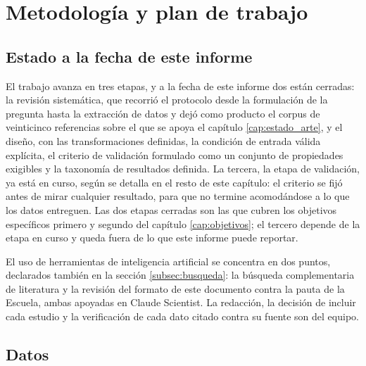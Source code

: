 
\chapter{Metodología y plan de trabajo}
\label{cap:plan}

\section{Estado a la fecha de este informe}

El trabajo avanza en tres etapas, y a la fecha de este informe dos están cerradas: la revisión sistemática, que recorrió el protocolo desde la formulación de la pregunta hasta la extracción de datos y dejó como producto el corpus de veinticinco referencias sobre el que se apoya el capítulo \ref{cap:estado_arte}, y el diseño, con las transformaciones definidas, la condición de entrada válida explícita, el criterio de validación formulado como un conjunto de propiedades exigibles y la taxonomía de resultados definida. La tercera, la etapa de validación, ya está en curso, según se detalla en el resto de este capítulo: el criterio se fijó antes de mirar cualquier resultado, para que no termine acomodándose a lo que los datos entreguen. Las dos etapas cerradas son las que cubren los objetivos específicos primero y segundo del capítulo \ref{cap:objetivos}; el tercero depende de la etapa en curso y queda fuera de lo que este informe puede reportar.

El uso de herramientas de inteligencia artificial se concentra en dos puntos, declarados también en la sección \ref{subsec:busqueda}: la búsqueda complementaria de literatura y la revisión del formato de este documento contra la pauta de la Escuela, ambas apoyadas en Claude Scientist. La redacción, la decisión de incluir cada estudio y la verificación de cada dato citado contra su fuente son del equipo.

\section{Datos}

